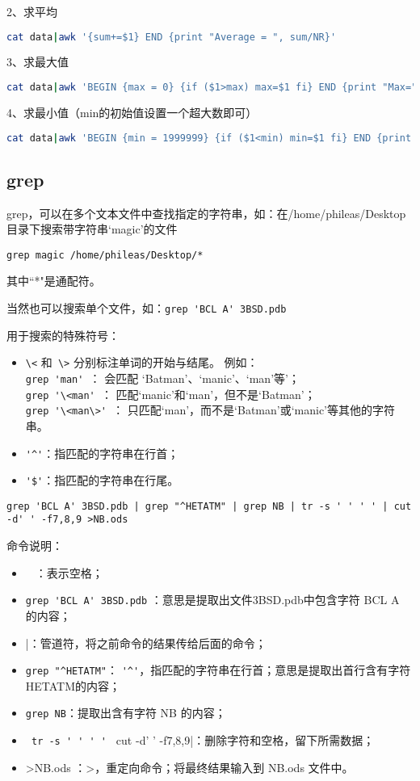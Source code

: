 2、求平均
\begin{lstlisting}[language=sh]
cat data|awk '{sum+=$1} END {print "Average = ", sum/NR}'
\end{lstlisting}

3、求最大值
\begin{lstlisting}[language=sh]
cat data|awk 'BEGIN {max = 0} {if ($1>max) max=$1 fi} END {print "Max=", max}'
\end{lstlisting}

4、求最小值（min的初始值设置一个超大数即可）
\begin{lstlisting}[language=sh]
cat data|awk 'BEGIN {min = 1999999} {if ($1<min) min=$1 fi} END {print "Min=", min}'
\end{lstlisting}



\subsection{grep}
grep，可以在多个文本文件中查找指定的字符串，如：在/home/phileas/Desktop目录下搜索带字符串‘magic’的文件

\verb|grep magic /home/phileas/Desktop/*|

其中``*"是通配符。

当然也可以搜索单个文件，如：\verb*[grep 'BCL A' 3BSD.pdb[

用于搜索的特殊符号：
\begin{itemize}
\item \verb|\<| 和\verb| \>| 分别标注单词的开始与结尾。 例如：\\ 
\verb|grep 'man' |： 会匹配 ‘Batman’、‘manic’、‘man’等'；\\
\verb|grep '\<man' |： 匹配‘manic’和‘man’，但不是‘Batman’；\\ 
\verb|grep '\<man\>' |： 只匹配‘man’，而不是‘Batman’或‘manic’等其他的字符串。 

\item \verb|'^'|：指匹配的字符串在行首；

\item \verb|'$'|：指匹配的字符串在行尾。
\end{itemize}


{\wuhao \verb*[grep 'BCL A' 3BSD.pdb | grep "^HETATM" | grep NB | tr -s ' ' ' ' | cut -d' ' -f7,8,9 >NB.ods[ }

命令说明：
\begin{itemize}
\item \verb*| | ：表示空格；
\item \verb*[grep 'BCL A' 3BSD.pdb[ ：意思是提取出文件3BSD.pdb中包含字符 BCL A 的内容；
\item |：管道符，将之前命令的结果传给后面的命令；
\item \verb*[grep "^HETATM"[： \verb|'^'|，指匹配的字符串在行首；意思是提取出首行含有字符HETATM的内容；
\item \verb*|grep NB|：提取出含有字符 NB 的内容；
\item \verb*| tr -s ' ' ' ' | cut -d' ' -f7,8,9|：删除字符和空格，留下所需数据；
\item >NB.ods ：>，重定向命令；将最终结果输入到 NB.ods 文件中。
\end{itemize}




